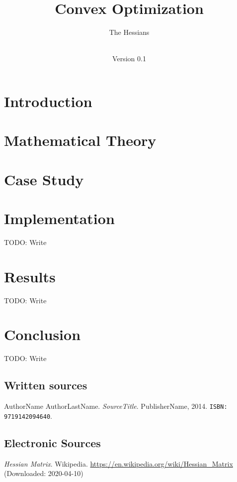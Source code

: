 \documentclass[notitlepage]{article}
\title{Convex Optimization\\}
\author{The Hessians}
\date{\documentdate\\Version 0.1} %
\begin{document}
\maketitle
\projectidentity
\authors

\newpage
\tableofcontents

\newpage
\listoffigures
{} 

\listoftables
{}

\newpage
{}

\section{Introduction}

\newpage

\section{Mathematical Theory}

\newpage

\section{Case Study}

\newpage

\section{Implementation}
TODO: Write
\newpage

\section{Results}
TODO: Write
\newpage

\section{Conclusion}
TODO: Write
\newpage

\begin{thebibliography}{9}
	\subsection*{Written sources}
	AuthorName AuthorLastName.
	\textit{SourceTitle}.
	PublisherName, 2014.
	\texttt{ISBN: 9719142094640}.
	
	\subsection*{Electronic Sources}
	\textit{Hessian Matrix}.
	Wikipedia.
	\url{https://en.wikipedia.org/wiki/Hessian_Matrix} (Downloaded: 2020-04-10)

\end{thebibliography}
\end{document}
